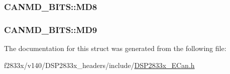 \subsubsection[{M\+D8}]{ C\+A\+N\+M\+D\+\_\+\+B\+I\+T\+S\+::\+M\+D8}\label{struct_c_a_n_m_d___b_i_t_s_a2b056230f454656386defe68a1fe0747}
\hypertarget{struct_c_a_n_m_d___b_i_t_s_a98c70eb5bdbb3203f56d6df70371f330}{}
\subsubsection[{M\+D9}]{ C\+A\+N\+M\+D\+\_\+\+B\+I\+T\+S\+::\+M\+D9}\label{struct_c_a_n_m_d___b_i_t_s_a98c70eb5bdbb3203f56d6df70371f330}


The documentation for this struct was generated from the following file\+:\begin{DoxyCompactItemize}
\item 
f2833x/v140/\+D\+S\+P2833x\+\_\+headers/include/\hyperlink{_d_s_p2833x___e_can_8h}{D\+S\+P2833x\+\_\+\+E\+Can.\+h}\end{DoxyCompactItemize}
